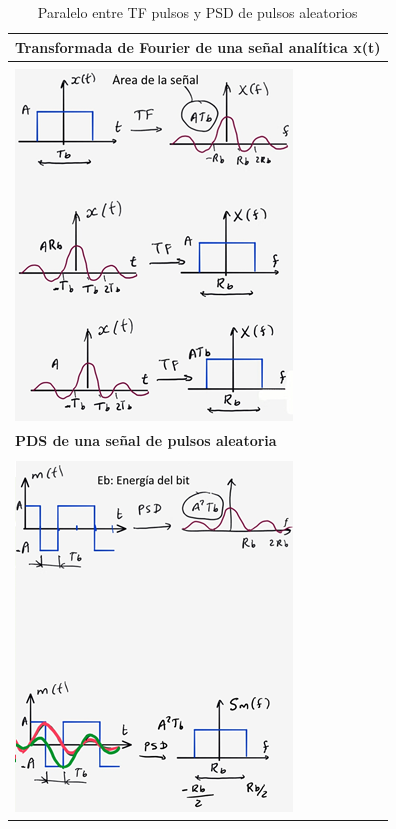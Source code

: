 \vspace{300px}
\begin{table}[h!]
	\captionsetup{justification = raggedright,singlelinecheck = false}
	\caption{\label{tabla:tabla6} Paralelo entre TF pulsos y PSD de pulsos aleatorios}
    \begin{center}
        \begin{tabular}{|l|}
        \hline
        \textbf{Transformada de Fourier de una señal analítica x(t)} \\
        \hline 
        \\  \hspace{13mm} \includegraphics[scale=1]{Imagenes/Transfor.png}\\
        \hline
        \textbf{PDS de una señal de pulsos aleatoria}\\
        \hline
        \\ \hspace{13mm} \includegraphics[scale=1]{Imagenes/Energia.png}\\
        \hline

        \end{tabular}
    \end{center}
\end{table}

